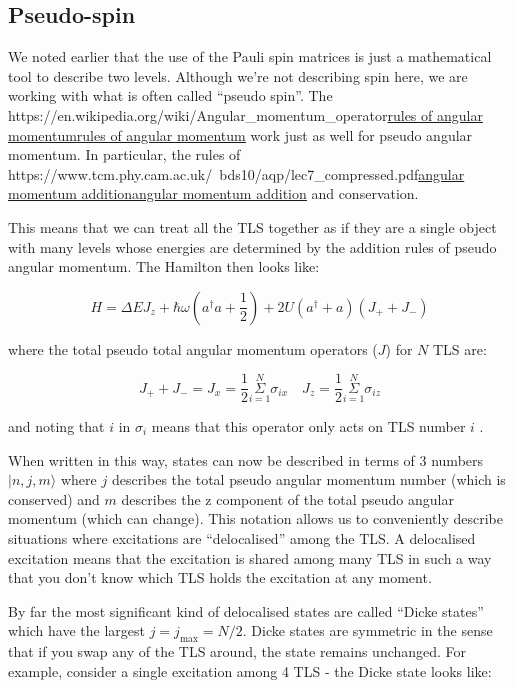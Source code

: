 \documentclass[
]{article}
\let\oldhref\href
\renewcommand{\href}[2]{\ifx#1\urlprefix\oldhref{#1}{#2}\else\uline{\oldhref{#1}{#2}}\fi}
\renewcommand{\[}{\begin{equation}}
\renewcommand{\]}{\end{equation}}
\begin{document}
\subsection{Pseudo-spin}\label{pseudo-spin}

We noted earlier that the use of the Pauli spin matrices is just a
mathematical tool to describe two levels. Although we're not describing
spin here, we are working with what is often called ``pseudo spin''. The
\href{https://en.wikipedia.org/wiki/Angular_momentum_operator}{rules of
angular momentum} work just as well for pseudo angular momentum. In
particular, the rules of
\href{https://www.tcm.phy.cam.ac.uk/~bds10/aqp/lec7_compressed.pdf}{angular
momentum addition} and conservation.

This means that we can treat all the TLS together as if they are a
single object with many levels whose energies are determined by the
addition rules of pseudo angular momentum. The Hamilton then looks like:

\[
H =  \Delta E J_{z} + \hbar\omega\left(a^{\dagger}a +\frac{1}{2}\right) + 2U\left( a^{\dagger} + a \right)(J_{+} + J_{-})
\label{eq:dickeHpseudo}
\]

where the total pseudo total angular momentum operators (\(J\)) for
\(N\) TLS are:

\[
J_{+} + J_{-} = J_{x} = \frac{1}{2}\overset{N}{\underset{i=1}{\Sigma}} \sigma_{i x} \,\,\,\,\,\, J_{z} = \frac{1}{2}\overset{N}{\underset{i=1}{\Sigma}} \sigma_{i z}
\]

and noting that \(i\) in \(\sigma_i\) means that this operator only acts
on TLS number \(i\) .

When written in this way, states can now be described in terms of 3
numbers \(|n, j, m\rangle\) where \(j\) describes the total pseudo
angular momentum number (which is conserved) and \(m\) describes the z
component of the total pseudo angular momentum (which can change). This
notation allows us to conveniently describe situations where excitations
are ``delocalised'' among the TLS. A delocalised excitation means that
the excitation is shared among many TLS in such a way that you don't
know which TLS holds the excitation at any moment.

By far the most significant kind of delocalised states are called
``Dicke states'' which have the largest \(j=j_{\max} = N/2\). Dicke
states are symmetric in the sense that if you swap any of the TLS
around, the state remains unchanged. For example, consider a single
excitation among 4 TLS - the Dicke state looks like:
\end{document}
